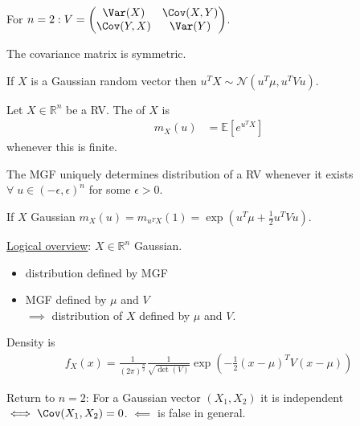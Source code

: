 For $n = 2: V = \begin{pmatrix}\Var(X) & \Cov(X, Y) \\ \Cov(Y, X) & \Var(Y)\end{pmatrix}$.

\begin{claim}
    The covariance matrix is symmetric.
\end{claim} 

\begin{claim}
    If $X$ is a Gaussian random vector then $u^T X \sim \mathcal{N}(u^T \mu, u^T V u)$.
\end{claim} 

\begin{definition}
    Let $X \in \mathbb{R}^n$ be a RV.
    The  of $X$ is 
    \begin{align*}
        m_X(u) &= \mathbb{E}\left[ e^{u^T X} \right]
    \end{align*} whenever this is finite.
\end{definition} 

\begin{theorem}
    The MGF uniquely determines distribution of a RV whenever it exists $\forall \; u \in (- \epsilon, \epsilon)^n$ for some $\epsilon > 0$.
\end{theorem} 

\begin{claim}
    If $X$ Gaussian $m_X(u) = m_{u^T X}(1) = \exp \left( u^T \mu + \frac{1}{2} u^T V u \right)$.
\end{claim} 

\color{blue}
\underline{Logical overview}: $X \in \mathbb{R}^n$ Gaussian.
\begin{itemize}
    \item distribution defined by MGF
    \item MGF defined by $\mu$ and $V$ \\
    $\implies$ distribution of $X$ defined by $\mu$ and $V$.
\end{itemize} 
\color{black}

\begin{remark}
    Density is \begin{align*}
        f_X(x) = \frac{1}{(2 \pi)^\frac{n}{2}} \frac{1}{\sqrt{\det(V)}} \exp \left( - \frac{1}{2} (x - \mu)^T V (x - \mu) \right)
    \end{align*} 
\end{remark} 

\begin{claim}
    Return to $n = 2$: For a Gaussian vector $(X_1, X_2)$ it is independent $\iff \Cov(X_1, X_2) = 0$. \color{red} $\impliedby$ is false in general.
\end{claim} 

